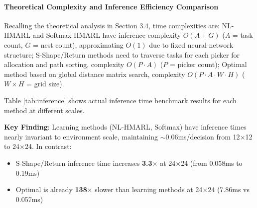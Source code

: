 \documentclass[12pt,a4paper]{article}
\begin{document}
\paragraph{Theoretical Complexity and Inference Efficiency Comparison}

Recalling the theoretical analysis in Section 3.4, time complexities are: NL-HMARL and Softmax-HMARL have inference complexity $O(A+G)$ ($A$ = task count, $G$ = nest count), approximating $O(1)$ due to fixed neural network structure; S-Shape/Return methods need to traverse tasks for each picker for allocation and path sorting, complexity $O(P \cdot A)$ ($P$ = picker count); Optimal method based on global distance matrix search, complexity $O(P \cdot A \cdot W \cdot H)$ ($W \times H$ = grid size).

Table \ref{tab:inference} shows actual inference time benchmark results for each method at different scales.

\begin{table}[ht]
\centering
\caption{Inference Efficiency Comparison of Methods}
\label{tab:inference}
\end{table}

\textbf{Key Finding}: Learning methods (NL-HMARL, Softmax) have inference times nearly invariant to environment scale, maintaining $\sim$0.06ms/decision from 12$\times$12 to 24$\times$24. In contrast:
\begin{itemize}
\item S-Shape/Return inference time increases \textbf{3.3$\times$} at 24$\times$24 (from 0.058ms to 0.19ms)
\item Optimal is already \textbf{138$\times$} slower than learning methods at 24$\times$24 (7.86ms vs 0.057ms)
\end{itemize}
\end{document}
